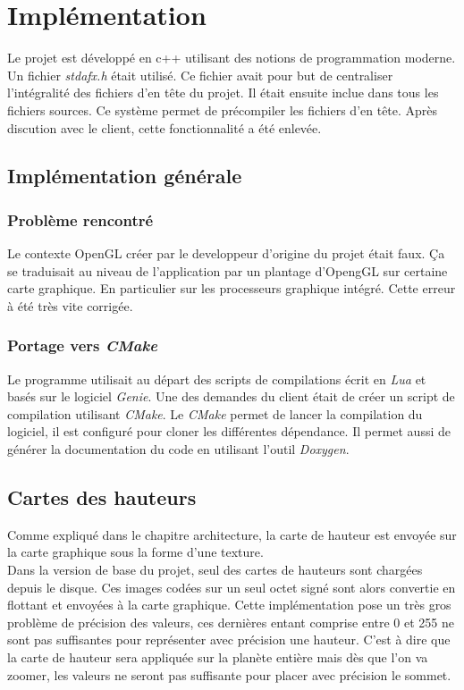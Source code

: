\chapter{Implémentation}
    Le projet est développé en c++ utilisant des notions de programmation moderne.
    Un fichier \textit{stdafx.h} était utilisé. Ce fichier avait pour but de centraliser l'intégralité des fichiers d'en tête du projet. Il était ensuite inclue dans tous les fichiers sources. Ce système permet de précompiler les fichiers d'en tête. Après discution avec le client, cette fonctionnalité a été enlevée.

    \section{Implémentation générale}
    \subsection{Problème rencontré}
    Le contexte OpenGL créer par le developpeur d'origine du projet était faux. Ça se traduisait au niveau
    de l'application par un plantage d'OpengGL sur certaine carte graphique. En particulier sur les processeurs graphique intégré. Cette erreur à été très vite corrigée.
   
    \subsection{Portage vers \textit{CMake}}
    Le programme utilisait au départ des scripts de compilations écrit en \textit{Lua} et basés sur le logiciel \textit{Genie}.
    Une des demandes du client était de créer un script de compilation utilisant \textit{CMake}.
    Le \textit{CMake} permet de lancer la compilation du logiciel, il est configuré pour cloner les différentes dépendance. 
    Il permet aussi de générer la documentation du code en utilisant l'outil \textit{Doxygen}.\\
    
    \section{Cartes des hauteurs}
    Comme expliqué dans le chapitre architecture, la carte de hauteur est envoyée sur la carte graphique sous la forme
    d'une texture.\\
    Dans la version de base du projet, seul des cartes de hauteurs sont chargées depuis le disque. Ces images codées sur un
    seul octet signé sont alors convertie en flottant et envoyées à la carte graphique. Cette implémentation pose un très gros problème de précision des valeurs, ces dernières entant comprise entre 0 et 255 ne sont pas suffisantes pour représenter
    avec précision une hauteur. C'est à dire que la carte de hauteur sera appliquée sur la planète entière mais dès que l'on va zoomer, les valeurs ne seront pas suffisante pour placer avec précision le sommet.
    
